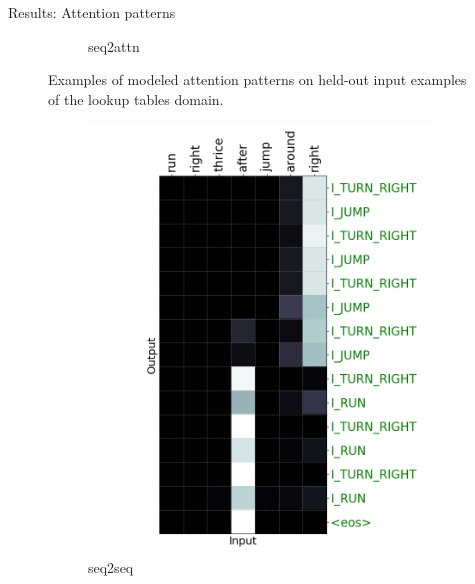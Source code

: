 \documentclass[final,hyperref={pdfpagelabels=false}]{beamer}
\begin{document}
\begin{frame}[t]
\begin{columns}[t]
\begin{column}{.465\textwidth}
\begin{block}{Results: Attention patterns}
\begin{figure}
\begin{subfigure}{.33\linewidth}
		\caption{seq2attn}
		\label{fig:attn_seq2attn_lookup_heldout_input}
	\end{subfigure}
	\caption{Examples of modeled attention patterns on held-out input examples of the lookup tables domain.}
	\label{fig:attn_lookup}
\end{figure}

\begin{figure}
	\centering
	\begin{subfigure}{.33\linewidth}
		\centering
		\includegraphics[width=0.77\linewidth,trim={3cm 0cm 0.9cm 0cm},clip]{Figures/attn_baseline_scan_1}
		\caption{seq2seq}
		\label{fig:scan_attn_baseline}
	\end{subfigure}%
	\begin{subfigure}{.33\linewidth}
		\centering

\end{subfigure}
\end{figure}
\end{block}
\end{column}
\end{columns}
\end{frame}
\end{document}
